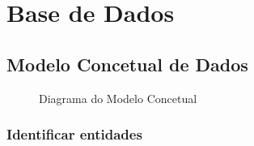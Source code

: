 \documentclass[a4paper,12pt]{scrreprt}
\begin{document}
\chapter{Base de Dados}

\section{Modelo Concetual de Dados}

\begin{figure}[H]
    \centering
    \caption{Diagrama do Modelo Concetual}
\end{figure}

\subsection{Identificar entidades}
\end{document}
